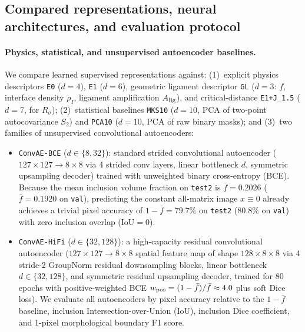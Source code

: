 \documentclass[preprint,11pt,a4paper]{elsarticle}
\begin{document}
\subsection{Compared representations, neural architectures, and evaluation protocol}
\label{sec:arch}
\label{sec:eval}

\paragraph{Physics, statistical, and unsupervised autoencoder baselines.}
We compare learned supervised representations against:
(1)~explicit physics descriptors \texttt{E0} ($d=4$), \texttt{E1} ($d=6$), geometric ligament descriptor \texttt{GL} ($d=3$: $f$, interface density $\rho_I$, ligament amplification $A_{\rm lig}$), and critical-distance \texttt{E1+J\_1.5} ($d=7$, for $R_\sigma$);
(2)~statistical baselines \texttt{MKS10} ($d=10$, PCA of two-point autocovariance $S_2$) and \texttt{PCA10} ($d=10$, PCA of raw binary masks); and
(3)~two families of unsupervised convolutional autoencoders:
\begin{itemize}
    \item \texttt{ConvAE-BCE} ($d\in\{8,32\}$): standard strided convolutional autoencoder ($127\times 127\to 8\times 8$ via 4 strided conv layers, linear bottleneck $d$, symmetric upsampling decoder) trained with unweighted binary cross-entropy (BCE). Because the mean inclusion volume fraction on \texttt{test2} is $\bar f=0.2026$ ($\bar f=0.1920$ on \texttt{val}), predicting the constant all-matrix image $x\equiv 0$ already achieves a trivial pixel accuracy of $1-\bar f = 79.7\%$ on \texttt{test2} ($80.8\%$ on \texttt{val}) with zero inclusion overlap ($\text{IoU}=0$).
    \item \texttt{ConvAE-HiFi} ($d\in\{32,128\}$): a high-capacity residual convolutional autoencoder ($127\times 127\to 8\times 8$ spatial feature map of shape $128\times 8\times 8$ via 4 stride-2 GroupNorm residual downsampling blocks, linear bottleneck $d\in\{32,128\}$, and symmetric residual upsampling decoder, trained for 80 epochs with positive-weighted BCE $w_{\rm pos}=(1-\bar f)/\bar f\approx 4.0$ plus soft Dice loss). We evaluate all autoencoders by pixel accuracy relative to the $1-\bar f$ baseline, inclusion Intersection-over-Union (IoU), inclusion Dice coefficient, and 1-pixel morphological boundary F1 score.
\end{itemize}
\end{document}
